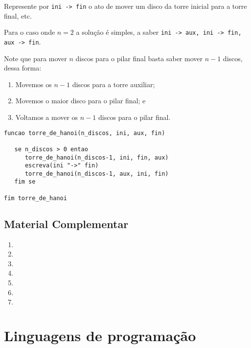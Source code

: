 Represente por \texttt{ini -> fin} o ato de mover um disco da torre inicial
para a torre final, etc.

Para o caso onde $n=2$ a solução é simples, a saber
\texttt{ini -> aux, ini -> fin, aux -> fin}.

Note que para mover $n$ discos para o pilar final
basta saber mover $n-1$ discos, dessa forma:
\begin{enumerate}[nosep]
\item Movemos os $n-1$ discos
para a torre auxiliar;
\item Movemos o maior disco para o pilar final; e
\item Voltamos a mover os $n-1$ discos para o pilar final.
\end{enumerate}

\begin{lstlisting}[style=pseudo]
funcao torre_de_hanoi(n_discos, ini, aux, fin)

   se n_discos > 0 entao
      torre_de_hanoi(n_discos-1, ini, fin, aux)
      escreva(ini "->" fin)
      torre_de_hanoi(n_discos-1, aux, ini, fin)
   fim se

fim torre_de_hanoi
\end{lstlisting}





\section{Material Complementar}

\begin{enumerate}[nosep]
\item {}
\item {}
\item {}
\item {}
\item {}
\item {}
\item {}
\end{enumerate}

\chapter{Linguagens de programação}

